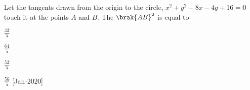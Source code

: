 \item Let the tangents drawn from the origin to the circle, $x^2 + y^2 - 8x - 4y + 16 = 0$ touch it at the points $A$ and $B$. The $\brak{AB}^2$ is equal to
     \item $\frac{32}{5}$
     \item $\frac{64}{5}$
     \item $\frac{52}{5}$
     \item $\frac{56}{5}$
  \hfill [Jan-2020]









            
